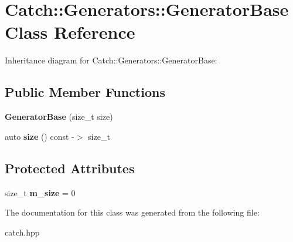 \hypertarget{classCatch_1_1Generators_1_1GeneratorBase}{}\section{Catch\+:\+:Generators\+:\+:Generator\+Base Class Reference}
\label{classCatch_1_1Generators_1_1GeneratorBase}


Inheritance diagram for Catch\+:\+:Generators\+:\+:Generator\+Base\+:
\subsection*{Public Member Functions}
\begin{DoxyCompactItemize}
\item 
{\bfseries Generator\+Base} (size\+\_\+t size)\hypertarget{classCatch_1_1Generators_1_1GeneratorBase_ab003974d458a14acfb48f79e7e8abe21}{}\label{classCatch_1_1Generators_1_1GeneratorBase_ab003974d458a14acfb48f79e7e8abe21}

\item 
auto {\bfseries size} () const -\/$>$ size\+\_\+t\hypertarget{classCatch_1_1Generators_1_1GeneratorBase_a2fb4a5c153f3fdc2708245b40751b487}{}\label{classCatch_1_1Generators_1_1GeneratorBase_a2fb4a5c153f3fdc2708245b40751b487}

\end{DoxyCompactItemize}
\subsection*{Protected Attributes}
\begin{DoxyCompactItemize}
\item 
size\+\_\+t {\bfseries m\+\_\+size} = 0\hypertarget{classCatch_1_1Generators_1_1GeneratorBase_ac6ab90adfdda9401e2ea03db5b2dfc6a}{}\label{classCatch_1_1Generators_1_1GeneratorBase_ac6ab90adfdda9401e2ea03db5b2dfc6a}

\end{DoxyCompactItemize}


The documentation for this class was generated from the following file\+:\begin{DoxyCompactItemize}
\item 
catch.\+hpp\end{DoxyCompactItemize}
